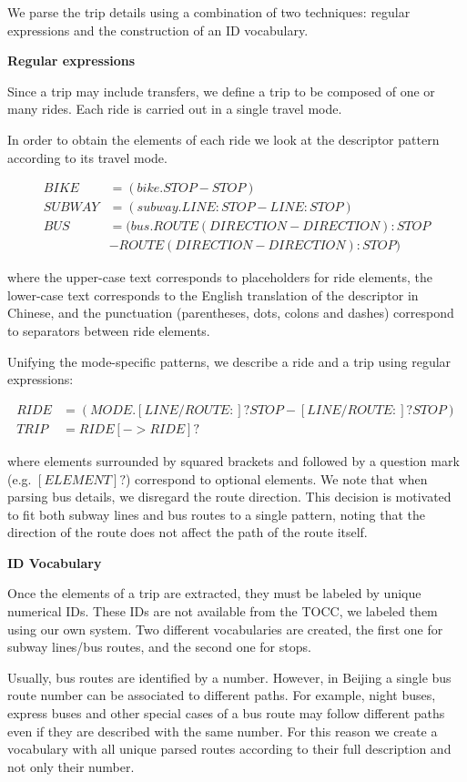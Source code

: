 \documentclass{article}
\begin{document}
We parse the trip details using a combination of two techniques: regular expressions and the construction of an ID vocabulary. 

\textbf{Regular expressions}

Since a trip may include transfers, we define a trip to be composed of one or many rides. Each ride is carried out in a single travel mode. 

In order to obtain the elements of each ride we look at the descriptor pattern according to its travel mode.

    \begin{align*}
    BIKE &= (bike.STOP-STOP) \\
    SUBWAY &= (subway.LINE:STOP-LINE:STOP) \\
    BUS &= (bus.ROUTE(DIRECTION-DIRECTION):STOP \\
    &-ROUTE(DIRECTION-DIRECTION):STOP)
	\end{align*}
	
where the upper-case text corresponds to placeholders for ride elements, the lower-case text corresponds to the English translation of the descriptor in Chinese, and the punctuation (parentheses, dots, colons and dashes) correspond to separators between ride elements.

Unifying the mode-specific patterns, we describe a ride and a trip using regular expressions:
    
	\begin{align*}	        
    RIDE &= (MODE.[LINE/ROUTE:]?STOP-[LINE/ROUTE:]?STOP) \\
    TRIP &= RIDE[->RIDE]? 
	\end{align*}    
	
where elements surrounded by squared brackets and followed by a question mark (e.g. $[ELEMENT]?$) correspond to optional elements. We note that when parsing bus details, we disregard the route direction. This decision is motivated to fit both subway lines and bus routes to a single pattern, noting that the direction of the route does not affect the path of the route itself.

\textbf{ID Vocabulary}

Once the elements of a trip are extracted, they must be labeled by unique numerical IDs. These IDs are not available from the TOCC, we labeled them using our own system. Two different vocabularies are created, the first one for subway lines/bus routes, and the second one for stops. 

Usually, bus routes are identified by a number. However, in Beijing a single bus route number can be associated to different paths. For example, night buses, express buses and other special cases of a bus route may follow different paths even if they are described with the same number. For this reason we create a vocabulary with all unique parsed routes according to their full description and not only their number.  
\end{document}

